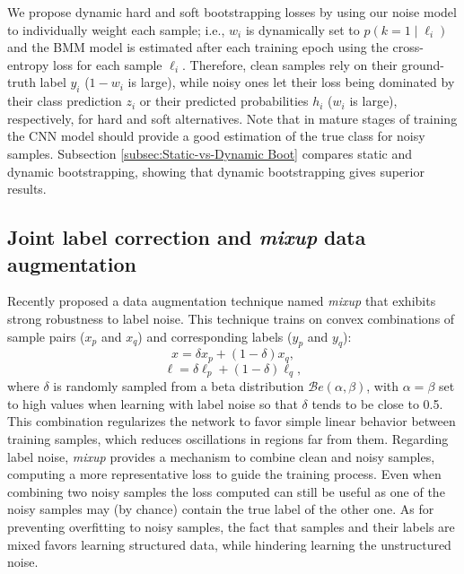 \documentclass{article}
\begin{document}
We propose dynamic hard and soft bootstrapping losses by
using our noise model to individually weight each sample; i.e., $w_{i}$
is dynamically set to $p\!\left(k=1\mid\ell_{i}\right)$ and the BMM
model is estimated after each training epoch using the cross-entropy
loss for each sample $\ell_{i}$. Therefore, clean samples rely on
their ground-truth label $y_{i}$ ($1-w_{i}$ is large), while noisy
ones let their loss being dominated by their class prediction $z_{i}$
or their predicted probabilities $\mathit{h_{i}}$ ($w_{i}$ is large),
respectively, for hard and soft alternatives. Note that in mature
stages of training the CNN model should provide a good
estimation of the true class for noisy samples. Subsection
\ref{subsec:Static-vs-Dynamic Boot} compares static and dynamic 
bootstrapping, showing that dynamic bootstrapping gives superior results.

\subsection{Joint label correction and \emph{mixup} data augmentation\label{subsec:JointMixBoot}}

Recently \cite{2018_ICLR_mixup} proposed a data augmentation technique
named \emph{mixup} that exhibits strong robustness to label
noise. This technique trains on convex combinations of sample pairs ($x_{p}$ and $x_{q}$) and corresponding labels ($y_{p}$
and $y_{q}$): 
\begin{equation}
x=\delta x_{p}+(1-\delta)x_{q},
\end{equation}
\begin{equation}
\ell=\delta\ell_{p}+(1-\delta)\ell_{q},\label{eq:MixupLoss}
\end{equation}
where $\delta$ is randomly sampled from a beta distribution $\mathcal{B}e\left(\alpha,\beta\right)$,
with $\alpha=\beta$ set to high values when learning with label
noise so that $\delta$ tends to be close to 0.5. This combination regularizes the network to favor simple linear
behavior between training samples, which reduces oscillations
in regions far from them. Regarding label
noise, \emph{mixup} provides a mechanism to combine clean and noisy samples, computing a more representative loss to guide
the training process. Even when combining two noisy
samples the loss computed can still be useful as one of the noisy
samples may (by chance) contain the true label of the other one. As for preventing
overfitting to noisy samples, the fact that samples and their labels
are mixed favors learning structured data, while hindering learning
the unstructured noise.
\end{document}
